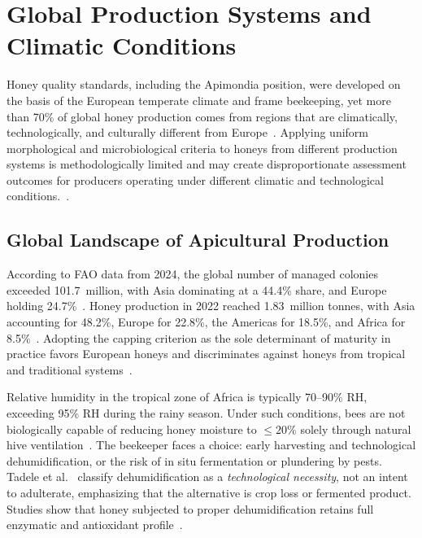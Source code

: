 \section{Global Production Systems and Climatic Conditions}

Honey quality standards, including the Apimondia position, were
developed on the basis of the European temperate climate and
frame beekeeping, yet more than 70\% of global honey production
comes from regions that are climatically, technologically, and
culturally different from
Europe~\cite{garcia2025,eudir2001110}. Applying uniform morphological and microbiological criteria to honeys from different production systems is methodologically limited and may create disproportionate assessment outcomes for producers operating under different climatic and technological conditions.~\cite{phiri2022,tadele2025}.

\subsection{Global Landscape of Apicultural Production}

According to FAO data from 2024, the global number of managed
colonies exceeded 101.7~million, with Asia dominating
at a 44.4\% share, and Europe holding 24.7\%~\cite{destatis2026}.
Honey production in 2022 reached 1.83~million tonnes, with
Asia accounting for 48.2\%, Europe for 22.8\%, the Americas
for 18.5\%, and Africa for 8.5\%~\cite{phiri2022}. Adopting
the capping criterion as the sole determinant of maturity in
practice favors European honeys and discriminates against honeys
from tropical and traditional
systems~\cite{tadele2025,phiri2022}.




Relative humidity in the tropical zone of Africa is typically
70--90\% RH, exceeding 95\% RH during the rainy season.
Under such conditions, bees are not biologically capable of
reducing honey moisture to $\leq 20\%$ solely through natural
hive ventilation~\cite{tadele2025}. The beekeeper faces a choice:
early harvesting and technological dehumidification, or the risk
of in situ fermentation or plundering by pests. Tadele et al.~\cite{tadele2025}
classify dehumidification as a \emph{technological necessity},
not an intent to adulterate, emphasizing that the alternative
is crop loss or fermented product. Studies show that honey
subjected to proper dehumidification retains full enzymatic
and antioxidant profile~\cite{lastriyanto2020,spel3upm}.

